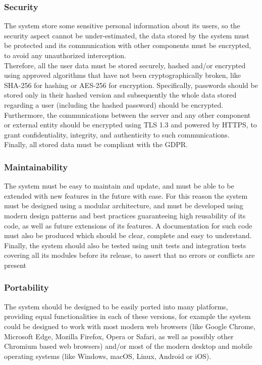 \documentclass[../RASD.tex]{subfiles}
\begin{document}
        \subsubsection{Security}
            The system store some sensitive personal information about its users, so the security aspect cannot be under-estimated, the data stored by the system must be protected and its communication with other components must be encrypted, to avoid any unauthorized interception.\\
            Therefore, all the user data must be stored securely, hashed and/or encrypted using approved algorithms that have not been cryptographically broken, like SHA-256 for hashing or AES-256 for encryption. Specifically, passwords should be stored only in their hashed version and subsequently the whole data stored regarding a user (including the hashed password) should be encrypted.\\  Furthermore, the communications between the server and any other component or external entity should be encrypted using TLS 1.3 and powered by HTTPS, to grant confidentiality, integrity, and authenticity to such communications.\\
            Finally, all stored data must be compliant with the GDPR.\newpage

        \subsubsection{Maintainability}
            The system must be easy to maintain and update, and must be able to be extended with new features in the future with ease. For this reason the system must be designed using a modular architecture, and must be developed using modern design patterns and best practices guaranteeing high reusability of its code, as well as future extensions of its features. A documentation for such code must also be produced which should be clear, complete and easy to understand. Finally, the system should also be tested using unit tests and integration tests covering all its modules before its release, to assert that no errors or conflicts are present       

        \subsubsection{Portability}
        The system should be designed to be easily ported into many platforms, providing equal functionalities in each of these versions, for example the system could be designed to work with most modern web browsers (like Google Chrome,  Microsoft Edge, Mozilla Firefox, Opera or Safari, as well as possibly other Chromium based web browsers) and/or most of the modern desktop and mobile operating systems (like Windows, macOS, Linux, Android or iOS).
\end{document}
